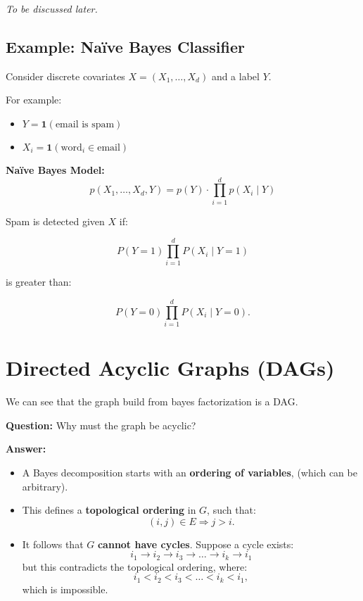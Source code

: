 \documentclass{article}%
\begin{document}
\textit{To be discussed later.}

\subsection{Example: Naïve Bayes Classifier}
Consider discrete covariates \( X = (X_1, \dots, X_d) \) and a label \( Y \).

For example:
\begin{itemize}
    \item \( Y = \mathbf{1}(\text{email is spam}) \)
    \item \( X_i = \mathbf{1}(\text{word}_i \in \text{email}) \)
\end{itemize}

\textbf{Naïve Bayes Model:}
\[
p(X_1, \dots, X_d, Y) = p(Y) \cdot \prod_{i=1}^{d} p(X_i \mid Y)
\]

Spam is detected given \( X \) if:

\[
P(Y=1) \prod_{i=1}^{d} P(X_i \mid Y=1)
\]

is greater than:

\[
P(Y=0)  \prod_{i=1}^{d} P(X_i \mid Y=0).
\]



\section{Directed Acyclic Graphs (DAGs)}
We can see that the graph build from bayes factorization is a DAG.

\textbf{Question:} Why must the graph be acyclic?

\textbf{Answer:}
\begin{itemize}
    \item A Bayes decomposition starts with an \textbf{ordering of variables}, (which can be arbitrary).
    \item This defines a \textbf{topological ordering} in \( G \), such that:
          \[
          (i, j) \in E \Rightarrow j > i.
          \]
    \item It follows that \( G \) \textbf{cannot have cycles}. Suppose a cycle exists:
          \[
          i_1 \to i_2 \to i_3 \to \dots \to i_k \to i_1
          \]
          but this contradicts the topological ordering, where:
          \[
          i_1 < i_2 < i_3 < \dots < i_k < i_1,
          \]
          which is impossible.
\end{itemize}
\end{document}
